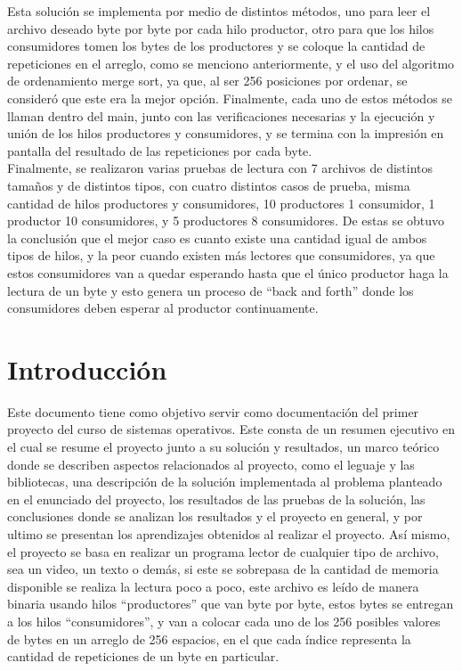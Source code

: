 \documentclass[10pt, article, natbib]{IEEEtran}
\begin{document}
Esta solución se implementa por medio de distintos métodos, uno para leer el archivo deseado byte por byte por cada hilo productor, otro para que los hilos consumidores tomen los bytes de los productores y se coloque la cantidad de repeticiones en el arreglo, como se menciono anteriormente, y el uso del algoritmo de ordenamiento merge sort, ya que, al ser 256 posiciones por ordenar, se consideró que este era la mejor opción. Finalmente, cada uno de estos métodos se llaman dentro del main, junto con las verificaciones necesarias y la ejecución y unión de los hilos productores y consumidores, y se termina con la impresión en pantalla del resultado de las repeticiones por cada byte.\\

Finalmente, se realizaron varias pruebas de lectura con 7 archivos de distintos tamaños y de distintos tipos, con cuatro distintos casos de prueba, misma cantidad de hilos productores y consumidores, 10 productores 1 consumidor, 1 productor 10 consumidores, y 5 productores 8 consumidores. De estas se obtuvo la conclusión que el mejor caso es cuanto existe una cantidad igual de ambos tipos de hilos, y la peor cuando existen más lectores que consumidores, ya que estos consumidores van a quedar esperando hasta que el único productor haga la lectura de un byte y esto genera un proceso de “back and forth” donde los consumidores deben esperar al productor continuamente.\\

\newpage
\twocolumn
\section{Introducción}
Este documento tiene como objetivo servir como documentación del primer proyecto del curso de sistemas operativos. Este consta de un resumen ejecutivo en el cual se resume el proyecto junto a su solución y resultados, un marco teórico donde se describen aspectos relacionados al proyecto, como el leguaje y las bibliotecas, una descripción de la solución implementada al problema planteado en el enunciado del proyecto, los resultados de las pruebas de la solución, las conclusiones donde se analizan los resultados y el proyecto en general, y por ultimo se presentan los aprendizajes obtenidos al realizar el proyecto. Así mismo, el proyecto se basa en realizar un programa lector de cualquier tipo de archivo, sea un video, un texto o demás, si este se sobrepasa de la cantidad de memoria disponible se realiza la lectura poco a poco, este archivo es leído de manera binaria usando hilos “productores” que van byte por byte, estos bytes se entregan a los hilos “consumidores”, y van a colocar cada uno de los 256 posibles valores de bytes en un arreglo de 256 espacios, en el que cada índice representa la cantidad de repeticiones de un byte en particular.
\end{document}
